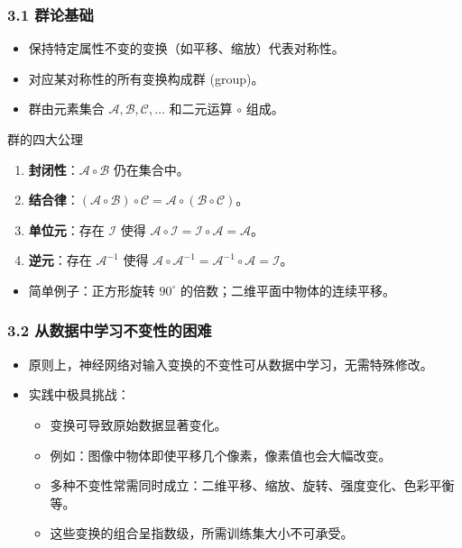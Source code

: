 \documentclass[t,aspectratio=169]{beamer} %
\begin{document}
\begin{frame}
    \frametitle{3.1 群论基础}
    \begin{itemize}
        \item 保持特定属性不变的变换（如平移、缩放）代表\alert{对称性}。
        \item 对应某对称性的所有变换构成\alert{群} (group)。
        \item 群由元素集合 $\mathcal{A}, \mathcal{B}, \mathcal{C}, \dots$ 和二元运算 $\circ$ 组成。
    \end{itemize}
    \begin{block}{群的四大公理}
        \begin{enumerate}
            \item \textbf{封闭性}：$\mathcal{A} \circ \mathcal{B}$ 仍在集合中。
            \item \textbf{结合律}：$(\mathcal{A} \circ \mathcal{B}) \circ \mathcal{C} = \mathcal{A} \circ (\mathcal{B} \circ \mathcal{C})$。
            \item \textbf{单位元}：存在 $\mathcal{I}$ 使得 $\mathcal{A} \circ \mathcal{I} = \mathcal{I} \circ \mathcal{A} = \mathcal{A}$。
            \item \textbf{逆元}：存在 $\mathcal{A}^{-1}$ 使得 $\mathcal{A} \circ \mathcal{A}^{-1} = \mathcal{A}^{-1} \circ \mathcal{A} = \mathcal{I}$。
        \end{enumerate}
    \end{block}
    \begin{itemize}
        \item 简单例子：正方形旋转 $90^\circ$ 的倍数；二维平面中物体的连续平移。
    \end{itemize}
\end{frame}

\begin{frame}
    \frametitle{3.2 从数据中学习不变性的困难}
    \begin{itemize}
        \item 原则上，神经网络对输入变换的不变性可\alert{从数据中学习}，无需特殊修改。
        \item 实践中极具挑战：
        \begin{itemize}
            \item 变换可导致原始数据\alert{显著变化}。
            \item 例如：图像中物体即使平移几个像素，像素值也会大幅改变。
            \item 多种不变性常需\alert{同时成立}：二维平移、缩放、旋转、强度变化、色彩平衡等。
            \item 这些变换的组合\alert{呈指数级}，所需训练集大小\alert{不可承受}。
        \end{itemize}
    \end{itemize}
\end{frame}
\end{document}
